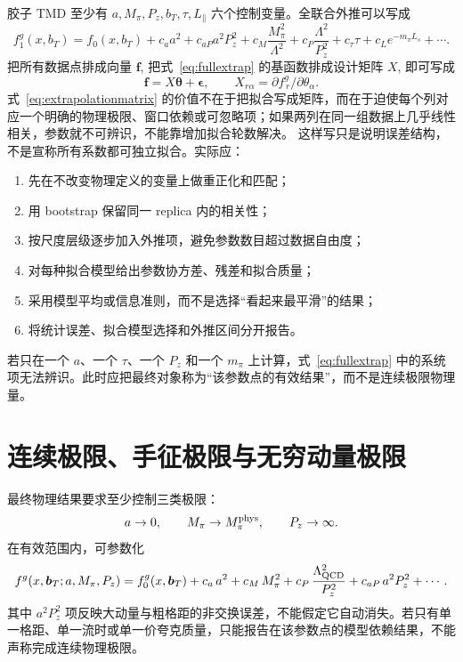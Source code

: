 \documentclass[UTF8,12pt,a4paper,twoside,openany]{ctexbook}
\newcommand{\bT}{\boldsymbol b_T}
\begin{document}
胶子 TMD 至少有 \(a,M_\pi,P_z,b_T,\tau,L_\parallel\) 六个控制变量。全联合外推可以写成
\begin{equation}
  f_1^g(x,b_T)
  =f_0(x,b_T)
  +c_a a^2+c_{aP}a^2P_z^2+c_M\frac{M_\pi^2}{\Lambda^2}
  +c_P\frac{\Lambda^2}{P_z^2}
  +c_\tau\tau+c_L e^{-m_\pi L_s}
  +\cdots .
  \label{eq:fullextrap}
\end{equation}
把所有数据点排成向量 \(\mathbf f\), 把式~\eqref{eq:fullextrap} 的基函数排成设计矩阵 \(X\), 即可写成
\begin{equation}
  \mathbf f=X\boldsymbol\theta+\boldsymbol\epsilon,
  \qquad
  X_{r\alpha}=\partial f^{g}_{\,r}/\partial\theta_\alpha .
  \label{eq:extrapolationmatrix}
\end{equation}
式~\eqref{eq:extrapolationmatrix} 的价值不在于把拟合写成矩阵，而在于迫使每个列对应一个明确的物理极限、窗口依赖或可忽略项；如果两列在同一组数据上几乎线性相关，参数就不可辨识，不能靠增加拟合轮数解决。
这样写只是说明误差结构，不是宣称所有系数都可独立拟合。实际应：
\begin{enumerate}
  \item 先在不改变物理定义的变量上做重正化和匹配；
  \item 用 bootstrap 保留同一 replica 内的相关性；
  \item 按尺度层级逐步加入外推项，避免参数数目超过数据自由度；
  \item 对每种拟合模型给出参数协方差、残差和拟合质量；
  \item 采用模型平均或信息准则，而不是选择“看起来最平滑”的结果；
  \item 将统计误差、拟合模型选择和外推区间分开报告。
\end{enumerate}
若只在一个 \(a\)、一个 \(\tau\)、一个 \(P_z\) 和一个 \(m_\pi\) 上计算，式~\eqref{eq:fullextrap} 中的系统项无法辨识。此时应把最终对象称为“该参数点的有效结果”，而不是连续极限物理量。

\section{连续极限、手征极限与无穷动量极限}

最终物理结果要求至少控制三类极限：
\begin{equation}
  a\to0,\qquad M_\pi\to M_\pi^{\rm phys},\qquad P_z\to\infty .
  \label{eq:threelimits}
\end{equation}
在有效范围内，可参数化
\begin{equation}
  f^{g}(x,\bT;a,M_\pi,P_z)
  =f^{g}_{0}(x,\bT)
  +c_a\,a^2+c_M\,M_\pi^2+c_P\,\frac{\Lambda_{\rm QCD}^2}{P_z^2}
  +c_{aP}\,a^2P_z^2+\cdots .
  \label{eq:extrapolation}
\end{equation}
其中 \(a^2P_z^2\) 项反映大动量与粗格距的非交换误差，不能假定它自动消失。若只有单一格距、单一流时或单一价夸克质量，只能报告在该参数点的模型依赖结果，不能声称完成连续物理极限。
\end{document}
